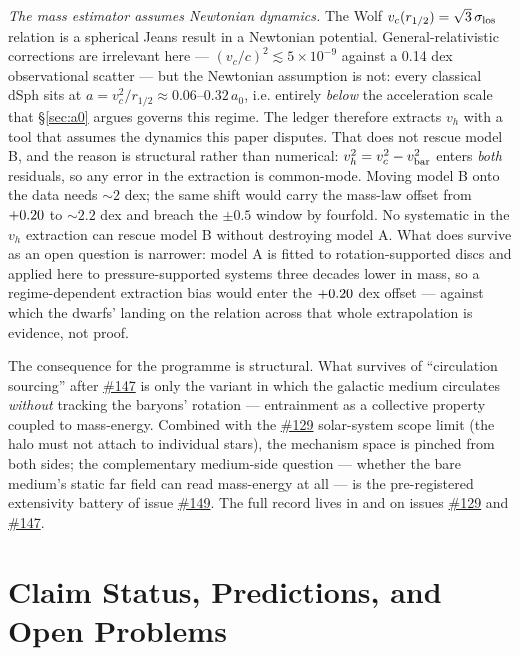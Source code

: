 \documentclass[11pt,a4paper]{article}
\providecommand{\ssvfile}[1]{\hyperref[file:#1]{\texttt{\detokenize{#1}}}}
\providecommand{\ssvissue}[1]{\hyperref[issue:#1]{\##1}}
\begin{document}
\emph{The mass estimator assumes Newtonian dynamics.}  The Wolf
$v_c(r_{1/2}) = \sqrt3\,\sigma_{\rm los}$ relation is a spherical
Jeans result in a Newtonian potential.  General-relativistic
corrections are irrelevant here --- $(v_c/c)^2 \lesssim 5\times10^{-9}$
against a 0.14 dex observational scatter --- but the Newtonian
assumption is not: every classical dSph sits at
$a = v_c^2/r_{1/2} \approx 0.06$--$0.32\,a_0$, i.e. entirely
\emph{below} the acceleration scale that \S\ref{sec:a0} argues governs
this regime.  The ledger therefore extracts $v_h$ with a tool that
assumes the dynamics this paper disputes.  That does not rescue model
B, and the reason is structural rather than numerical:
$v_h^2 = v_c^2 - v_{\rm bar}^2$ enters \emph{both} residuals, so any
error in the extraction is common-mode.  Moving model B onto the data
needs $\sim2$ dex; the same shift would carry the mass-law offset from
$+0.20$ to $\sim2.2$ dex and breach the $\pm0.5$ window
by fourfold.  No systematic in the $v_h$ extraction can rescue model B
without destroying model A.  What does survive as an open question is
narrower: model A is fitted to rotation-supported discs and applied
here to pressure-supported systems three decades lower in mass, so a
regime-dependent extraction bias would enter the $+0.20$
dex offset --- against which the dwarfs' landing on the relation across
that whole extrapolation is evidence, not proof.

The consequence for the programme is structural.  What survives of
``circulation sourcing'' after \ssvissue{147} is only the variant in
which the galactic medium circulates \emph{without} tracking the
baryons' rotation --- entrainment as a collective property coupled to
mass-energy.  Combined with the \ssvissue{129} solar-system scope limit
(the halo must not attach to individual stars), the mechanism space is
pinched from both sides; the complementary medium-side question ---
whether the bare medium's static far field can read mass-energy at all
--- is the pre-registered extensivity battery of issue \ssvissue{149}.
The full record lives in \ssvfile{dsph-ledger-issue147} and on issues
\ssvissue{129} and \ssvissue{147}.

\section{Claim Status, Predictions, and Open Problems}
\label{sec:status}
\end{document}
